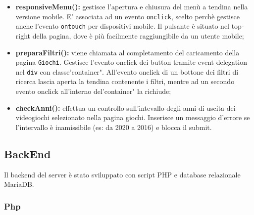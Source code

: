 \begin{itemize}
	\item \textbf{responsiveMenu(): } gestisce l'apertura e chiusura del menù a tendina nella versione mobile.
	E' associata ad un evento \texttt{onclick}, scelto perchè gestisce anche l'evento \texttt{ontouch} per dispositivi mobile.
	Il pulsante è situato nel top-right della pagina, dove è più facilmente raggiungibile da un utente mobile; \\

	\item \textbf{preparaFiltri(): } viene chiamata al completamento del caricamento della pagina \texttt{Giochi}. Gestisce l'evento onclick dei button tramite event delegation nel \texttt{div} con classe'container". All'evento onclick di un bottone dei filtri di ricerca lascia aperta la tendina contenente i filtri, mentre ad un secondo evento onclick all'interno del'container" la richiude; \\

	\item \textbf{checkAnni(): } effettua un controllo sull'intevallo degli anni di uscita dei videogiochi selezionato nella pagina giochi.
	Inserisce un messaggio d'errore se l'intervallo è inamissibile (es: da 2020 a 2016) e blocca il submit. \\
\end{itemize}




\subsection{BackEnd}
Il backend del server è stato sviluppato con script PHP e database relazionale MariaDB.

\subsubsection{Php}

